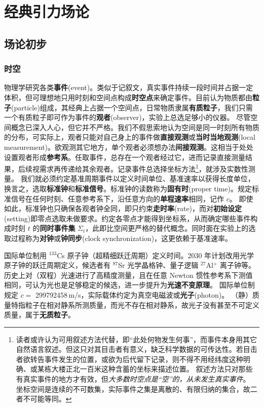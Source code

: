 \chapter{经典引力场论}\label{chpt:GR}
\section{场论初步}
\subsection{时空}

物理学研究各类\textbf{事件}(event)。类似于记叙文，真实事件持续一段时间并占据一定体积，但可理想地只用时刻和空间点构成\textbf{时空点}来确定事件。目前认为物质都由\textbf{粒子}(particle)组成，其经典上占据一个空间点，日常物质隶属\textbf{有质粒子}，我们只需一个有质粒子即可作为事件的\textbf{观者}(observer)，实验上总选足够小的仪器。
尽管空间概念已深入人心，但它并不严格。我们不假思索地认为空间是同一时刻所有物质的分布，可实际上，观者只能对自己身上的事件做\textbf{直接观测}或\textbf{当时当地观测}(local measurement)。欲观测其它地方，单个观者必须想办法\textbf{间接观测}。这相当于处处设置观者形成\textbf{参考系}。任取事件，总存在一个观者经过它，进而记录直接测量结果，后续视需求再传递给其余观者。记录事件总选择坐标方法\footnote{读者或许认为可用叙述方法代替，即“此处何物发生何事”，而事件本身用其它自然语言叙述。但这只对其目击者有意义，缺乏科学数据的可传达性。若目击者欲转告事件发生的位置，或欲为后代留下记录，则不得不用经纬度这种明确、或某栋大楼正北一百米这种含蓄的坐标来描述位置。
叙述方法只对那些有真实事件的地方才有效，但\textit{大多数时空点是“空”的，从未发生真实事件}。
坐标空间是连续的不可数集，实际事件之集是离散的、有限归纳的集合，故二者不可能等同。}，就涉及实数性测量。
我们就必须约定基准周期事件以定义时间单位、基准速率以获得长度单位，换言之，选取\textbf{标准钟}和\textbf{标准信号}。标准钟的读数称为\textbf{固有时}(proper time)。规定标准信号在任何时刻、任意参考系下，沿任意方向的\textbf{单程速率}相同，记作 $c$。
即使如此，标准钟也只确保各观者钟全同，即只约束\textbf{走时率}(rate)，而对\textbf{初始设定}(setting)即零点选取未做要求。约定各零点才能得到坐标系，从而确定哪些事件构成时刻 $t$ 的\textbf{同时事件集} $\Sigma_t$，此即比空间更严格的替代概念。同时面在实验上的选取过程称为\textbf{对钟}或\textbf{钟同步}(clock synchronization)，这更依赖于基准速率。

国际单位制用 $^{133}$Cs 原子钟（超精细跃迁周期）定义时间。2030 年计划改用光学原子钟的跃迁周期定义，候选者有 $^{87}$Sr 光学晶格钟、量子逻辑 $^{27}$Al$^+$ 离子钟等。
历史上对（双程）光速进行了高精度测量，且在任意 Newton 惯性参考系下测值相同，可认为光也是足够稳定的候选，进一步提升为\textbf{光速不变原理}。
国际单位制规定 $c=$ 299792458\,m/s，实际载体约定为真空电磁波或\textbf{光子}(photon)。
（静）质量特指粒子在相对静系所测质量，而光不存在相对静系，故光子没有甚至不可定义质量，属于\textbf{无质粒子}。

